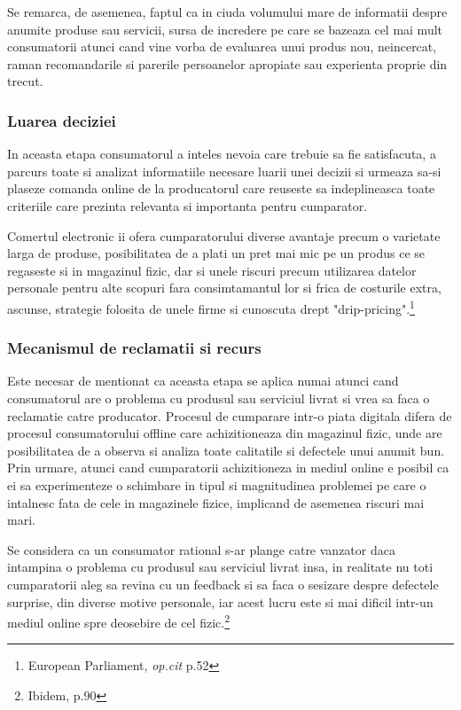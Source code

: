\documentclass[a4paper, 12pt]{article}
\begin{document}
		\quad Se remarca, de asemenea, faptul ca in ciuda volumului mare de informatii despre anumite produse sau servicii, sursa de incredere pe care se bazeaza cel mai mult consumatorii atunci cand vine vorba de evaluarea unui produs nou, neincercat, raman recomandarile si parerile persoanelor apropiate sau experienta proprie din trecut.
		
		\subsubsection{Luarea deciziei}
		
		\quad\quad In aceasta etapa consumatorul a inteles nevoia care trebuie sa fie satisfacuta, a parcurs toate si analizat informatiile necesare luarii unei decizii si urmeaza sa-si plaseze comanda online de la producatorul care reuseste sa indeplineasca toate criteriile care prezinta relevanta si importanta pentru cumparator.
		
		\quad  Comertul electronic ii ofera cumparatorului diverse avantaje precum o varietate larga de produse, posibilitatea de a plati un pret mai mic pe un produs ce se regaseste si in magazinul fizic, dar si unele riscuri precum utilizarea datelor personale pentru alte scopuri  fara consimtamantul lor si frica de costurile extra, ascunse, strategie folosita de unele firme si cunoscuta drept "drip-pricing".\footnote{European Parliament, \textit{op.cit} p.52}
		
		\subsubsection{Mecanismul de reclamatii si recurs}
		
		\quad\quad Este necesar de mentionat ca aceasta etapa se aplica numai atunci cand consumatorul are o problema cu produsul sau serviciul livrat si vrea sa faca o reclamatie catre producator. Procesul de cumparare intr-o piata digitala difera de procesul consumatorului offline care achizitioneaza din magazinul fizic, unde are posibilitatea de a observa si analiza toate calitatile si defectele unui anumit bun. Prin urmare, atunci cand cumparatorii achizitioneza in mediul online e posibil ca ei sa experimenteze o schimbare in tipul si magnitudinea problemei pe care o intalnesc fata de cele in magazinele fizice, implicand de asemenea riscuri mai mari.
		
		\quad Se considera ca un consumator rational s-ar plange catre vanzator daca intampina o problema cu produsul sau serviciul livrat insa, in realitate nu toti cumparatorii aleg sa revina cu un feedback si sa faca o sesizare despre defectele surprise, din diverse motive personale, iar acest lucru este si mai dificil intr-un mediul online spre deosebire de cel fizic.\footnote{Ibidem, p.90}
		
\end{document}

